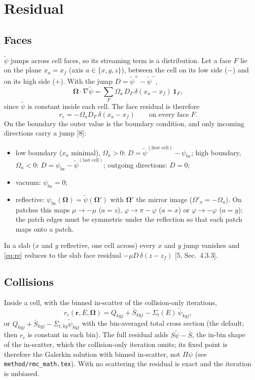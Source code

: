 \documentclass[11pt]{article}
\newcommand{\tpsi}{\tilde\psi}
\newcommand{\Sbar}{\bar S}
\newcommand{\Sigt}{\Sigma_t}
\newcommand{\Om}{\boldsymbol\Omega}
\begin{document}
\section{Residual}

\subsection{Faces}

$\tpsi$ jumps across cell faces, so its streaming term is a distribution. Let a face
$F$ lie on the plane $x_a=x_f$ (axis $a\in\{x,y,z\}$), between the cell on its low
side ($-$) and on its high side ($+$). With the jump $D=\tpsi^+-\tpsi^-$,
\begin{equation}
  \Om\cdot\nabla\tpsi = \sum_F \Omega_a\, D_F\, \delta(x_a-x_f)\,\mathbf 1_F ,
\end{equation}
since $\tpsi$ is constant inside each cell. The face residual is therefore
\begin{equation}
  r_e = -\Omega_a D_F\, \delta(x_a - x_f) \qquad\text{on every face } F .
  \label{eq:re}
\end{equation}
On the boundary the outer value is the boundary condition, and only incoming
directions carry a jump [8]:
\begin{itemize}
  \item low boundary ($x_a$ minimal), $\Omega_a>0$: $D = \tpsi^{(\text{first cell})}
  - \psi_{\text{bc}}$; high boundary, $\Omega_a<0$: $D = \psi_{\text{bc}} -
  \tpsi^{(\text{last cell})}$; outgoing directions: $D=0$;
  \item vacuum: $\psi_{\text{bc}}=0$;
  \item reflective: $\psi_{\text{bc}}(\Om) = \tpsi(\Om')$ with $\Om'$ the mirror image
  ($\Omega'_a=-\Omega_a$). On patches this maps $\mu\to-\mu$ ($a=z$),
  $\varphi\to\pi-\varphi$ ($a=x$) or $\varphi\to-\varphi$ ($a=y$); the patch edges
  must be symmetric under the reflection so that each patch maps onto a patch.
\end{itemize}
In a slab ($x$ and $y$ reflective, one cell across) every $x$ and $y$ jump vanishes
and \eqref{eq:re} reduces to the slab face residual $-\mu D\,\delta(z-z_f)$ [5,
Sec.~4.3.3].

\subsection{Collisions}

Inside a cell, with the binned in-scatter of the collision-only iterations,
\begin{equation}
  r_c(\mathbf r,E,\Om) = Q_{kgj} + \Sbar_{kgj} - \Sigt(E)\,\tpsi_{kgj} ,
\end{equation}
or $Q_{kgj} + \Sbar_{kgj} - \bar\Sigma_{t,kg}\tpsi_{kgj}$ with the bin-averaged total
cross section (the default; then $r_c$ is constant in each bin). The full residual
adds $S\tpsi - \Sbar$, the in-bin shape of the in-scatter, which the collision-only
iteration omits; its fixed point is therefore the Galerkin solution with binned
in-scatter, not $\Pi\psi$ (see \texttt{method/rmc\_math.tex}). With no scattering the
residual is exact and the iteration is unbiased.
\end{document}
